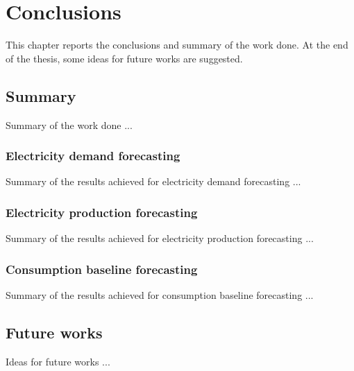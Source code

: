 \chapter{Conclusions}
\label{cha:conclusions}
\vspace{0.4 cm}

This chapter reports the conclusions and summary of the work done.
At the end of the thesis, some ideas for future works are suggested.


\section{Summary}
\label{sec:summary}
\vspace{0.2 cm}

Summary of the work done ...


\vspace{0.1 cm}
\subsection{Electricity demand forecasting}
\label{sec:conclusionsdemand}
\vspace{0.1 cm}

Summary of the results achieved for electricity demand forecasting ...


\vspace{0.1 cm}
\subsection{Electricity production forecasting}
\label{sec:conclusionsproduction}
\vspace{0.1 cm}

Summary of the results achieved for electricity production forecasting ...


\vspace{0.1 cm}
\subsection{Consumption baseline forecasting}
\label{sec:conclusionsbaseline}
\vspace{0.1 cm}

Summary of the results achieved for consumption baseline forecasting ...


\section{Future works}
\label{sec:future}
\vspace{0.2 cm}

Ideas for future works ...

